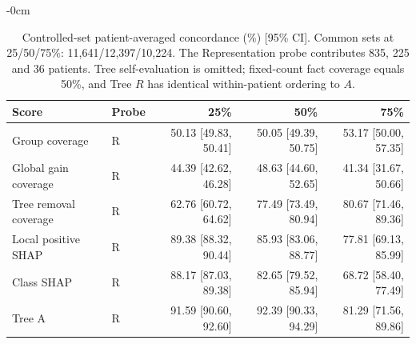 \begin{table}[!tbp]\begin{adjustwidth}{-\extralength}{0cm}\centering\footnotesize
\caption{Controlled-set patient-averaged concordance (\%) [95\% CI]. Common sets at 25/50/75\%: 11,641/12,397/10,224. The Representation probe contributes 835, 225 and 36 patients. Tree self-evaluation is omitted; fixed-count fact coverage equals 50\%, and Tree $R$ has identical within-patient ordering to $A$.}\label{tab:controlled-core}
\begin{tabular}{llrrr}\toprule
Score & Probe & 25\% & 50\% & 75\% \\ \midrule
Group coverage & R & 50.13 [49.83, 50.41] & 50.05 [49.39, 50.75] & 53.17 [50.00, 57.35] \\
Global gain coverage & R & 44.39 [42.62, 46.28] & 48.63 [44.60, 52.65] & 41.34 [31.67, 50.66] \\
Tree removal coverage & R & 62.76 [60.72, 64.62] & 77.49 [73.49, 80.94] & 80.67 [71.46, 89.36] \\
Local positive SHAP & R & 89.38 [88.32, 90.44] & 85.93 [83.06, 88.77] & 77.81 [69.13, 85.99] \\
Class SHAP & R & 88.17 [87.03, 89.38] & 82.65 [79.52, 85.94] & 68.72 [58.40, 77.49] \\
Tree A & R & 91.59 [90.60, 92.60] & 92.39 [90.33, 94.29] & 81.29 [71.56, 89.86] \\
\bottomrule\end{tabular}\end{adjustwidth}\end{table}
